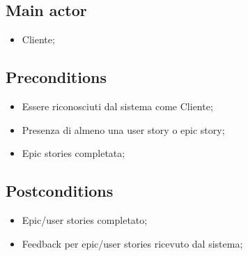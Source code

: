 \documentclass{article}
\begin{document}
    \subsection*{Main actor}
    \begin{itemize}
        \item Cliente;
    \end{itemize}
    
    \subsection*{Preconditions}
    \begin{itemize}
        \item Essere riconosciuti dal sistema come Cliente;
        \item Presenza di almeno una user story o epic story;
        \item Epic stories completata;
    \end{itemize}
    
    \subsection*{Postconditions}
    \begin{itemize}
        \item Epic/user stories completato;
        \item Feedback per epic/user stories ricevuto dal sistema; 
    \end{itemize}
    
\end{document}
